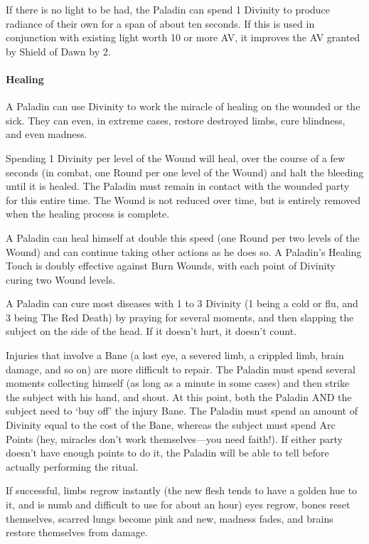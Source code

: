 \documentclass[oneside,11pt,english]{book}
\begin{document}
If there is no light to be had, the Paladin can spend 1 Divinity to produce radiance of their own 
for a span of about ten seconds. If this is used in conjunction with existing light worth 10 or more 
AV, it improves the AV granted by Shield of Dawn by 2. 
\paragraph{Healing}
A Paladin can use Divinity to work the miracle of healing on the wounded or the sick. They can 
even, in extreme cases, restore destroyed limbs, cure blindness, and even madness.

Spending 1 Divinity per level of the Wound will heal, over the course of a few seconds (in 
combat, one Round per one level of the Wound) and halt the bleeding until it is healed. The 
Paladin must remain in contact with the wounded party for this entire time. The Wound is not 
reduced over time, but is entirely removed when the healing process is complete. 

A Paladin can heal himself at double this speed (one Round per two levels of the Wound) and can 
continue taking other actions as he does so. A Paladin's Healing Touch is doubly effective against 
Burn Wounds, with each point of Divinity curing two Wound levels. 

A Paladin can cure most diseases with 1 to 3 Divinity (1 being a cold or flu, and 3 being The Red 
Death) by praying for several moments, and then slapping the subject on the side of the head. If it 
doesn't hurt, it doesn't count. 

Injuries that involve a Bane (a lost eye, a severed limb, a crippled limb, brain damage, and so on) 
are more difficult to repair. The Paladin must spend several moments collecting himself (as long 
as a minute in some cases) and then strike the subject with his hand, and shout. At this point, both 
the Paladin AND the subject need to ‘buy off’ the injury Bane. The Paladin must spend an 
amount of Divinity equal to the cost of the Bane, whereas the subject must spend Arc Points (hey, 
miracles don't work themselves—you need faith!). If either party doesn't have enough points to 
do it, the Paladin will be able to tell before actually performing the ritual. 


If successful, limbs regrow instantly (the new flesh tends to have a golden hue to it, and is numb 
and difficult to use for about an hour) eyes regrow, bones reset themselves, scarred lungs become 
pink and new, madness fades, and brains restore themselves from damage.
\end{document}
